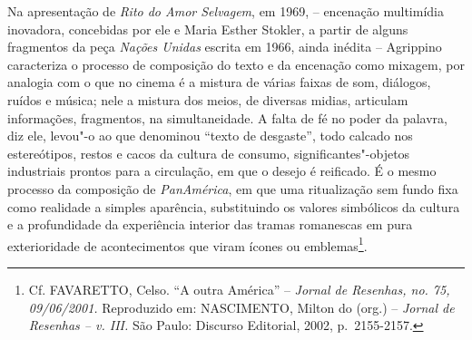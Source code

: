 Na apresentação de \emph{Rito do Amor Selvagem}, em 1969, -- encenação
multimídia inovadora, concebidas por ele e Maria Esther Stokler, a
partir de alguns fragmentos da peça \emph{Nações Unidas} escrita em
1966, ainda inédita -- Agrippino caracteriza o processo de composição do
texto e da encenação como mixagem, por analogia com o que no cinema é a
mistura de várias faixas de som, diálogos, ruídos e música; nele a
mistura dos meios, de diversas midias, articulam informações,
fragmentos, na simultaneidade. A falta de fé no poder da palavra, diz
ele, levou"-o ao que denominou ``texto de desgaste'', todo calcado nos
estereótipos, restos e cacos da cultura de consumo,
significantes"-objetos industriais prontos para a circulação, em que o
desejo é reificado. É o mesmo processo da composição de
\emph{PanAmérica}, em que uma ritualização sem fundo fixa como realidade
a simples aparência, substituindo os valores simbólicos da cultura e a
profundidade da experiência interior das tramas romanescas em pura
exterioridade de acontecimentos que viram ícones ou emblemas\footnote{Cf.
  \textsc{FAVARETTO}, Celso. ``A outra América'' -- \emph{Jornal de Resenhas, no.
  75, 09/06/2001.} Reproduzido em: \textsc{NASCIMENTO}, Milton do (org.) --
  \emph{Jornal de Resenhas -- v. \textsc{III}.} São Paulo: Discurso Editorial, 2002,
  p.~2155-2157.}.

